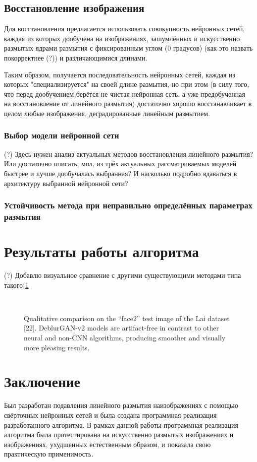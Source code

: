 \newpage
\subsection{Восстановление изображения}
Для восстановления предлагается использовать совокупность нейронных сетей, каждая из которых дообучена на изображениях, зашумлённых и искусственно размытых ядрами размытия с фиксированным углом (0 градусов) (как это назвать покорректнее (?))
и различающимися длинами.

Таким образом, получается последовательность нейронных сетей, каждая из которых "специализируется" на своей длине размытия, но при этом (в силу того, что перед дообучением берётся не чистая нейронная сеть, а уже предобученная на восстановление от линейного размытия) достаточно хорошо восстанавливает в целом любые изображения, деградированные линейным размытием.

\subsubsection{Выбор модели нейронной сети}
 (?) Здесь нужен анализ актуальных методов восстановления линейного размытия?
Или достаточно описать, мол, из трёх актуальных рассматриваемых моделей быстрее и лучше дообучалась выбранная? И насколько подробно вдаваться в архитектуру выбранной нейронной сети?

\subsubsection{Устойчивость метода при неправильно определённых параметрах размытия}


\newpage
\section{Результаты работы алгоритма}

(?) Добавлю визуальное сравнение с другими существующими методами типа такого  \ref{ris:restore_example}
\begin{figure}[H]
 \\ 
\caption{Qualitative comparison on the “face2” test image of the Lai dataset [22]. DeblurGAN-v2 models are artifact-free in contrast to other neural and non-CNN algorithms, producing smoother and visually more pleasing results.}
\label{ris:restore_example}
\end{figure}

\newpage
\section{Заключение}
Был разработан подавления линейного размытия наизображениях с помощью свёрточных нейронных сетей и была создана программная реализация разработанного алгоритма.
В рамках данной работы программная реализация алгоритма была протестирована
на искусственно размытых изображениях и изображениях, ухудшенных естественным образом, и показала свою практическую применимость.


\newpage
\printbibliography[heading=bibintoc]

